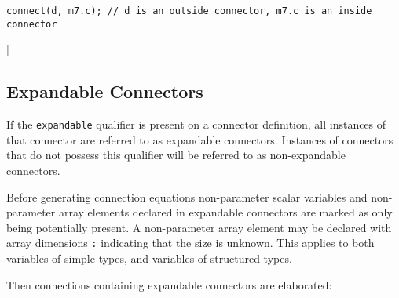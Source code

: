 \begin{lstlisting}[language=modelica]
  connect(d, m7.c); // d is an outside connector, m7.c is an inside connector
\end{lstlisting}
{]}

\subsection{Expandable Connectors}

If the \lstinline!expandable! qualifier is present on a connector definition, all
instances of that connector are referred to as expandable connectors.
Instances of connectors that do not possess this qualifier will be
referred to as non-expandable connectors.

Before generating connection equations non-parameter scalar variables
and non-parameter array elements declared in expandable connectors are
marked as only being potentially present. A non-parameter array element
may be declared with array dimensions \lstinline!:! indicating that the size is
unknown. This applies to both variables of simple types, and variables
of structured types.

Then connections containing expandable connectors are elaborated:

